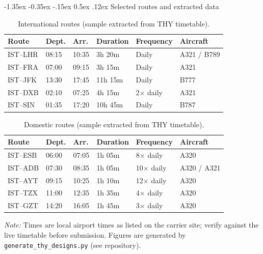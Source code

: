 \documentclass[11pt]{article}
\makeatletter
\renewcommand\subsection{\@startsection{subsection}{2}{\z@}%
  {-1.35ex \@plus -0.35ex \@minus -.15ex}%
  {0.5ex \@plus .12ex}%
  {\normalfont\large\bfseries}}
\makeatother
\begin{document}
\subsection{Selected routes and extracted data}

\begin{table}[H]
  \centering
  \small
  \caption{International routes (sample extracted from THY timetable).}
  \label{tab:thy-intl}
  \begin{tabular}{@{}llllll@{}}
    \toprule
    \textbf{Route} & \textbf{Dept.} & \textbf{Arr.} & \textbf{Duration} & \textbf{Frequency} & \textbf{Aircraft} \\
    \midrule
    IST--LHR & 08:15 & 10:35 & 3h 20m & Daily & A321 / B789 \\
    IST--FRA & 07:00 & 09:15 & 3h 15m & Daily & A321 \\
    IST--JFK & 13:30 & 17:45 & 11h 15m & Daily & B777 \\
    IST--DXB & 02:10 & 07:25 & 4h 15m & 2$\times$ daily & A321 \\
    IST--SIN & 01:35 & 17:20 & 10h 45m & Daily & B787 \\
    \bottomrule
  \end{tabular}
\end{table}

\begin{table}[H]
  \centering
  \small
  \caption{Domestic routes (sample extracted from THY timetable).}
  \label{tab:thy-dom}
  \begin{tabular}{@{}llllll@{}}
    \toprule
    \textbf{Route} & \textbf{Dept.} & \textbf{Arr.} & \textbf{Duration} & \textbf{Frequency} & \textbf{Aircraft} \\
    \midrule
    IST--ESB & 06:00 & 07:05 & 1h 05m & 8$\times$ daily & A320 \\
    IST--ADB & 07:30 & 08:35 & 1h 05m & 10$\times$ daily & A320 / A321 \\
    IST--AYT & 09:15 & 10:25 & 1h 10m & 12$\times$ daily & A320 \\
    IST--TZX & 11:00 & 12:35 & 1h 35m & 4$\times$ daily & A320 \\
    IST--GZT & 14:20 & 16:05 & 1h 45m & 3$\times$ daily & A320 \\
    \bottomrule
  \end{tabular}
\end{table}

\noindent\textit{Note:} Times are local airport times as listed on the carrier site; verify against the live timetable before submission. Figures are generated by \texttt{generate\_thy\_designs.py} (see repository).
\end{document}
